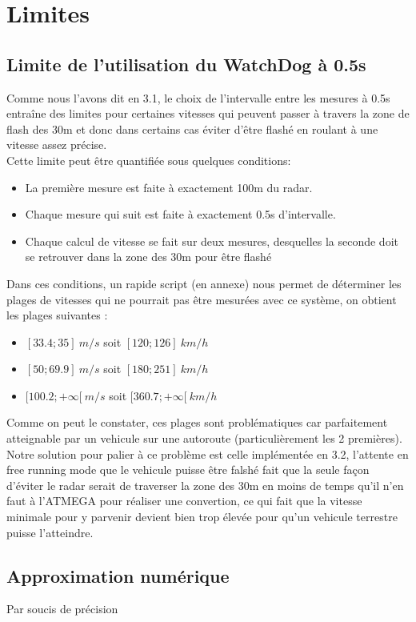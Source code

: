 \documentclass[a4paper, 12pt]{article}
\begin{document}
		
		\section{Limites}
		\subsection{Limite de l'utilisation du WatchDog à 0.5s}
		Comme nous l'avons dit en 3.1, le choix de l'intervalle entre les mesures à 0.5s entraîne des limites pour certaines vitesses qui peuvent passer à travers la zone de flash des 30m et donc dans certains cas éviter d'être flashé en roulant à une vitesse assez précise.\\
		Cette limite peut être quantifiée sous quelques conditions:
		\begin{itemize}
			\item La première mesure est faite à exactement 100m du radar.
			\item Chaque mesure qui suit est faite à exactement 0.5s d'intervalle.
			\item Chaque calcul de vitesse se fait sur deux mesures, desquelles la seconde doit se retrouver dans la zone des 30m pour être flashé
		\end{itemize}
		Dans ces conditions, un rapide script (en annexe) nous permet de déterminer les plages de vitesses qui ne pourrait pas être mesurées avec ce système, on obtient les plages suivantes :
		\begin{itemize}
			\item $[33.4;35]\ m/s$ soit $[120;126]\ km/h$
			\item $[50;69.9]\ m/s$ soit $[180;251]\ km/h$
			\item $[100.2;+\infty[\ m/s$ soit $[360.7;+\infty[\ km/h$
		\end{itemize}
		Comme on peut le constater, ces plages sont problématiques car parfaitement atteignable par un vehicule sur une autoroute (particulièrement les 2 premières). Notre solution pour palier à ce problème est celle implémentée en 3.2, l'attente en free running mode que le vehicule puisse être falshé fait que la seule façon d'éviter le radar serait de traverser la zone des 30m en moins de temps qu'il n'en faut à l'ATMEGA pour réaliser une convertion, ce qui fait que la vitesse minimale pour y parvenir devient bien trop élevée pour qu'un vehicule terrestre puisse l'atteindre.
	
		\subsection{Approximation numérique}
		Par soucis de précision 
		
\end{document}
